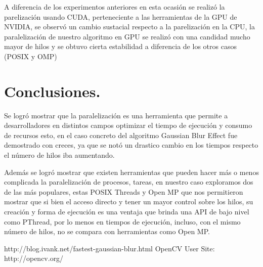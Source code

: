\documentclass{IEEEtran}
\begin{document}
A diferencia de los experimentos anteriores en esta ocasión se realizó la parelización usando CUDA, perteneciente a las herramientas de la GPU de NVIDIA, se observó un cambio sustacial respecto a la parelización en la CPU, la paralelización de nuestro algoritmo en GPU se realizó con una candidad mucho mayor de hilos y se obtuvo cierta estabilidad a diferencia de los otros casos (POSIX y OMP)


\section*{Conclusiones.}

Se logró mostrar que la paralelización es una herramienta que permite a desarrolladores en distintos campos optimizar el tiempo de ejecución y consumo de recursos esto, en el caso concreto del algoritmo Gaussian Blur Effect fue demostrado con creces, ya que se notó un drastico cambio en los tiempos respecto el número de hilos iba aumentando.

Además se logró mostrar que existen herramientas que pueden hacer más o menos complicada la paralelización de procesos, tareas, en nuestro caso exploramos dos de las más populares, estas POSIX Threads y Open MP que nos permitieron mostrar que si bien el acceso directo y tener un mayor control sobre los hilos, su creación y forma de ejecución es una ventaja que brinda una API de bajo nivel como PThread, por lo menos en tiempos de ejecución, incluso, con el mismo número de hilos, no se compara con herramientas como Open MP.

\noindent 



http://blog.ivank.net/fastest-gaussian-blur.html
OpenCV User Site: http://opencv.org/
\end{document}
